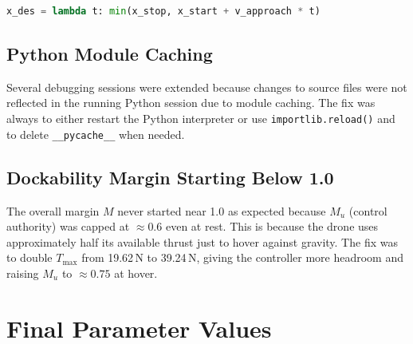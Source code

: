 \documentclass[12pt]{article}
\begin{document}
\begin{lstlisting}[language=Python]
x_des = lambda t: min(x_stop, x_start + v_approach * t)
\end{lstlisting}

\subsection{Python Module Caching}

Several debugging sessions were extended because changes to source files
were not reflected in the running Python session due to module caching.
The fix was always to either restart the Python interpreter or use
\texttt{importlib.reload()} and to delete \texttt{\_\_pycache\_\_} when
needed.

\subsection{Dockability Margin Starting Below 1.0}

The overall margin $M$ never started near 1.0 as expected because
$M_u$ (control authority) was capped at $\approx 0.6$ even at rest.
This is because the drone uses approximately half its available thrust
just to hover against gravity. The fix was to double $T_\mathrm{max}$
from 19.62\,N to 39.24\,N, giving the controller more headroom and
raising $M_u$ to $\approx 0.75$ at hover.

\section{Final Parameter Values}
\end{document}
